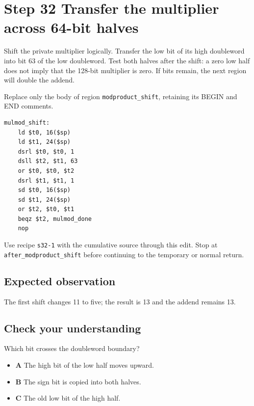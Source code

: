 \section{Step 32 Transfer the multiplier across 64-bit halves}\label{rsa-s32}

Shift the private multiplier logically. Transfer the low bit of its high doubleword into bit 63 of the low doubleword. Test both halves after the shift: a zero low half does not imply that the 128-bit multiplier is zero. If bits remain, the next region will double the addend.

Replace only the body of region \texttt{modproduct\_shift}, retaining its BEGIN and END comments.

\begin{verbatim}
mulmod_shift:
    ld $t0, 16($sp)
    ld $t1, 24($sp)
    dsrl $t0, $t0, 1
    dsll $t2, $t1, 63
    or $t0, $t0, $t2
    dsrl $t1, $t1, 1
    sd $t0, 16($sp)
    sd $t1, 24($sp)
    or $t2, $t0, $t1
    beqz $t2, mulmod_done
    nop
\end{verbatim}

Use recipe \texttt{s32-1} with the cumulative source through this edit. Stop at \texttt{after\_modproduct\_shift} before continuing to the temporary or normal return.

\subsection{Expected observation}
The first shift changes 11 to five; the result is 13 and the addend remains 13.

\subsection{Check your understanding}
Which bit crosses the doubleword boundary?

\begin{itemize}
  \item \textbf{A} The high bit of the low half moves upward.
  \item \textbf{B} The sign bit is copied into both halves.
  \item \textbf{C} The old low bit of the high half.
\end{itemize}
